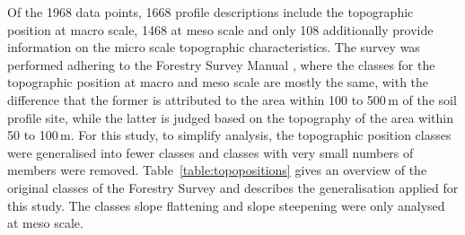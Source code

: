 \documentclass[preprint,12pt,authoryear]{elsarticle}
\begin{document}
Of the 1968 data points, 1668 profile descriptions include  the topographic position at macro scale, 1468 at meso scale and only 108 additionally provide information on the micro scale topographic characteristics. The survey was performed adhering to the Forestry Survey Manual \citep{Englisch1998}, where the classes for the topographic position at macro and meso scale are mostly the same, with the difference that the former is attributed to the area within 100 to 500\,m of the soil profile site, while the latter is judged based on the topography of the area within 50 to 100\,m. For this study, to simplify  analysis, the topographic position classes were generalised into fewer classes and classes with very small numbers of members were removed. Table~\ref{table:topopositions} gives an overview of the original classes of the Forestry Survey and describes the generalisation applied for this study. The classes slope flattening and slope steepening were only analysed at meso scale.
\end{document}
